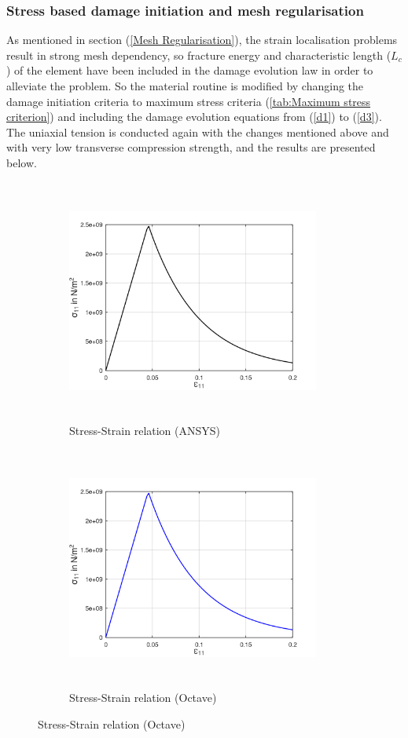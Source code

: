 \documentclass[12pt,a4paper,twoside,openright]{report}
\begin{document}
\subsubsection{Stress based damage initiation and mesh regularisation}
\indent\indent\indent As mentioned in section (\ref{Mesh Regularisation}), the strain localisation problems result in strong mesh dependency, so fracture energy and characteristic length ($L_{c}$) of the element have been included in the damage evolution law in order to alleviate the problem. So the material routine is modified by changing the damage initiation criteria to maximum stress criteria (\ref{tab:Maximum stress criterion}) and including the damage evolution equations from (\ref{d1}) to (\ref{d3}). The uniaxial tension is conducted again with the changes mentioned above and with very low transverse compression strength, and the results are presented below.
\begin{figure}[htbp!]
     \captionsetup[subfigure]{justification=centering}
     \begin{subfigure}{0.4\textwidth}
         \includegraphics[width=8.3cm,height=8cm,keepaspectratio]{22.StressvsStrain_Ansys.png}
         \caption{Stress-Strain relation (ANSYS)}
         \label{fig:Stress-Strain relation in Ansys2}
     \end{subfigure}
     \hspace{1.8cm}
     \begin{subfigure}{0.4\textwidth}
          \includegraphics[width=8.3cm,height=8cm,keepaspectratio]{22.StressvsStrain_Octave.png}
         \caption{Stress-Strain relation (Octave)}
         \label{fig:Stress-Strain relation Octave2}
     \end{subfigure}
\end{figure}
\end{document}
